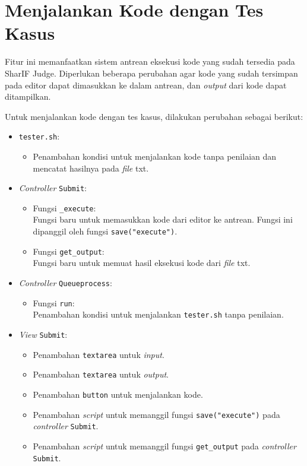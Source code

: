\section{Menjalankan Kode dengan Tes Kasus}
\label{sec:4:jalan}

Fitur ini memanfaatkan sistem antrean eksekusi kode yang sudah tersedia pada SharIF Judge. Diperlukan beberapa perubahan agar kode yang sudah tersimpan pada editor dapat dimasukkan ke dalam antrean, dan \textit{output} dari kode dapat ditampilkan.

Untuk menjalankan kode dengan tes kasus, dilakukan perubahan sebagai berikut:
\begin{itemize}
	\item \verb|tester.sh|:
    \begin{itemize}
        \item Penambahan kondisi untuk menjalankan kode tanpa penilaian dan mencatat hasilnya pada \textit{file} txt.
    \end{itemize}
	\item \textit{Controller} \verb|Submit|:
    \begin{itemize}
        \item Fungsi \verb|_execute|: \\ Fungsi baru untuk memasukkan kode dari editor ke antrean. Fungsi ini dipanggil oleh fungsi \verb|save("execute")|.
        \item Fungsi \verb|get_output|: \\ Fungsi baru untuk memuat hasil eksekusi kode dari \textit{file} txt.
    \end{itemize}
	\item \textit{Controller} \verb|Queueprocess|:
    \begin{itemize}
        \item Fungsi \verb|run|: \\ Penambahan kondisi untuk menjalankan \verb|tester.sh| tanpa penilaian.
    \end{itemize}
    \item \textit{View} \verb|Submit|:
    \begin{itemize}
		\item Penambahan \verb|textarea| untuk \textit{input}.
		\item Penambahan \verb|textarea| untuk \textit{output}.
        \item Penambahan \verb|button| untuk menjalankan kode.
        \item Penambahan \textit{script} untuk memanggil fungsi \verb|save("execute")| pada \textit{controller} \verb|Submit|.
        \item Penambahan \textit{script} untuk memanggil fungsi \verb|get_output| pada \textit{controller} \verb|Submit|.
    \end{itemize}
\end{itemize}

